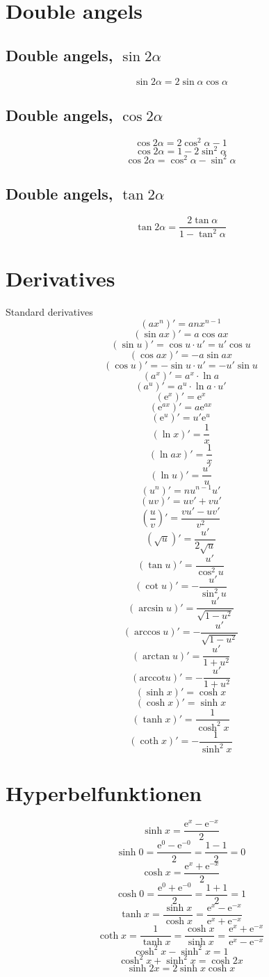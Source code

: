 \documentclass[a4paper, 10pt]{scrartcl}
\newcommand*\euler{\mathrm{e}}
\newcommand*\arccot{\mathrm{arccot}}
\begin{document}
\section{Double angels}

\subsection{Double angels, $\sin{2\alpha}$}
\[\sin{2\alpha} = 2\sin{\alpha}\cos{\alpha}\]

\subsection{Double angels, $\cos{2\alpha}$}
\[\cos{2\alpha} = 2\cos^{2}{\alpha} - 1\]
\[\cos{2\alpha} = 1 - 2\sin^{2}{\alpha}\]
\[\cos{2\alpha} = \cos^{2}{\alpha} - \sin^{2}{\alpha}\]

\subsection{Double angels, $\tan{2\alpha}$}
\[\tan{2\alpha} = \frac{2\tan{\alpha}}{1 - \tan^{2}{\alpha}}\]

\section{Derivatives}

Standard derivatives
\[(ax^{n})' = anx^{n-1}\]
\[(\sin{ax})' = a\cos{ax}\]
\[(\sin{u})' = \cos{u}\cdot u' = u'\cos{u}\]
\[(\cos{ax})' = -a\sin{ax}\]
\[(\cos{u})' = -\sin{u}\cdot u' = -u'\sin{u}\]
\[(a^{x})' = a^{x}\cdot\ln{a}\]
\[(a^{u})' = a^{u}\cdot\ln{a}\cdot u'\]
\[(\euler^{x})' = \euler^{x}\]
\[(\euler^{ax})' = a\euler^{ax}\]
\[(\euler^{u})' = u'\euler^{u}\]
\[(\ln{x})' = \frac{1}{x}\]
\[(\ln{ax})' = \frac{1}{x}\]
\[(\ln{u})' = \frac{u'}{u}\]
\[(u^{n})' = nu^{n-1}u'\]
\[(uv)' = uv' + vu'\]
\[\left(\frac{u}{v}\right)' = \frac{vu' - uv'}{v^{2}}\]
\[\left(\sqrt{u}\right)' = \frac{u'}{2\sqrt{u}}\]
\[(\tan{u})' = \frac{u'}{\cos^{2}{u}}\]
\[(\cot{u})' = -\frac{u'}{\sin^{2}{u}}\]
\[(\arcsin{u})' = \frac{u'}{\sqrt{1 - u^{2}}}\]
\[(\arccos{u})' = -\frac{u'}{\sqrt{1 - u^{2}}}\]
\[(\arctan{u})' = \frac{u'}{1 + u^{2}}\]
\[(\arccot{u})' = -\frac{u'}{1 + u^{2}}\]
\[(\sinh{x})' = \cosh{x}\]
\[(\cosh{x})' = \sinh{x}\]
\[(\tanh{x})' = \frac{1}{\cosh^{2}{x}}\]
\[(\coth{x})' = -\frac{1}{\sinh^{2}{x}}\]

\section{Hyperbelfunktionen}
\[\sinh{x} = \frac{\euler^{x} - \euler^{-x}}{2}\]
\[\sinh{0} = \frac{\euler^{0} - \euler^{-0}}{2} = \frac{1 - 1}{2} = 0\]
\[\cosh{x} = \frac{\euler^{x} + \euler^{-x}}{2}\]
\[\cosh{0} = \frac{\euler^{0} + \euler^{-0}}{2} = \frac{1 + 1}{2} = 1\]
\[\tanh{x} = \frac{\sinh{x}}{\cosh{x}} = \frac{\euler^{x} - \euler^{-x}}{\euler^{x} + \euler^{-x}}\]
\[\coth{x} = \frac{1}{\tanh{x}} = \frac{\cosh{x}}{\sinh{x}} = \frac{\euler^{x} + \euler^{-x}}{\euler^{x} - \euler^{-x}}\]
\[\cosh^{2}{x} - \sinh^{2}{x} = 1\]
\[\cosh^{2}{x} + \sinh^{2}{x} = \cosh{2x}\]
\[\sinh{2x} = 2\sinh{x}\cosh{x}\]
\end{document}

